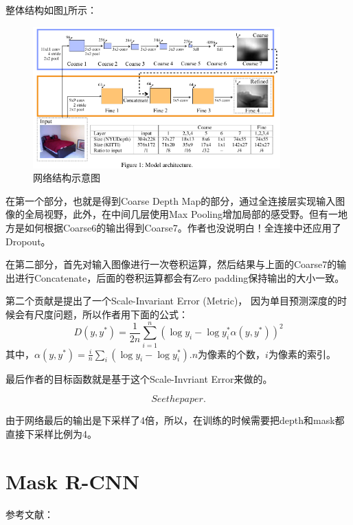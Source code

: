 整体结构如图\ref{DepthPrediction2014_0}所示：
\begin{figure}[!hbtp]
\centering
\includegraphics[width=0.85\textwidth]{SemanticSLAM/DepthPrediction2014_0.png}
\caption{网络结构示意图}
\label{DepthPrediction2014_0}
\end{figure}

在第一个部分，也就是得到Coarse Depth Map的部分，通过全连接层实现输入图像的全局视野，此外，在中间几层使用Max Pooling增加局部的感受野。但有一地方是如何根据Coarse6的输出得到Coarse7。作者也没说明白！全连接中还应用了Dropout。

在第二部分，首先对输入图像进行一次卷积运算，然后结果与上面的Coarse7的输出进行Concatenate，后面的卷积运算都会有Zero padding保持输出的大小一致。

第二个贡献是提出了一个Scale-Invariant Error (Metric)， 因为单目预测深度的时候会有尺度问题，所以作者用下面的公式：
\begin{displaymath}
D(y, y^{*})  = \frac{1}{2n}\sum_{i=1}^{n} \left( \log y_i - \log y^{*}_i  \alpha(y, y^{*}) \right)^2
\end{displaymath}
其中，$ \alpha(y, y^{*})= \frac{i}{n}\sum_{i}(\log y_i - \log y^{*}_i)$.$n$为像素的个数，$i$为像素的索引。

最后作者的目标函数就是基于这个Scale-Invriant Error来做的。

\begin{displaymath}
See the paper.
\end{displaymath}

由于网络最后的输出是下采样了4倍，所以，在训练的时候需要把depth和mask都直接下采样比例为4。

\section{Mask R-CNN}

参考文献：\cite{maskrcnn2017he}

